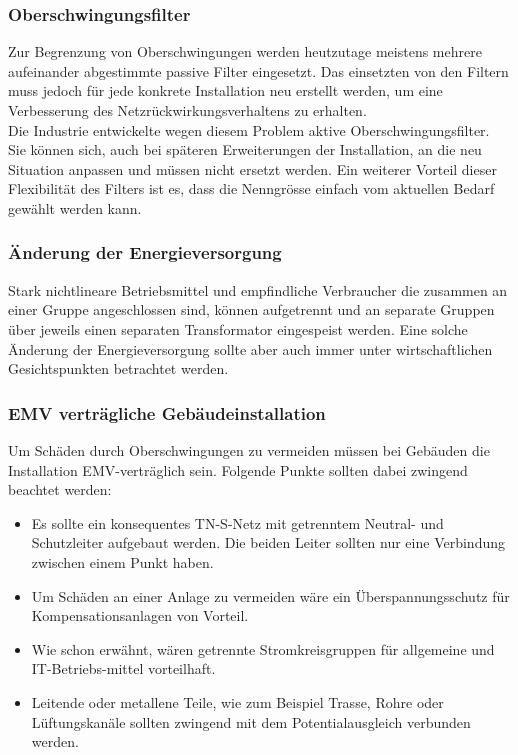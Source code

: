 \subsubsection{Oberschwingungsfilter}

Zur Begrenzung von Oberschwingungen werden heutzutage  meistens mehrere aufeinander abgestimmte passive Filter eingesetzt. Das einsetzten von den Filtern muss jedoch für jede konkrete Installation neu erstellt werden, um eine Verbesserung des Netzrückwirkungsverhaltens zu erhalten.\\
Die Industrie entwickelte wegen diesem Problem aktive Oberschwingungsfilter. Sie können sich, auch bei späteren Erweiterungen der Installation, an die neu Situation anpassen und müssen nicht ersetzt werden. Ein weiterer Vorteil dieser Flexibilität des Filters ist es, dass die Nenngrösse einfach vom aktuellen Bedarf gewählt werden kann.     

\subsubsection{Änderung der Energieversorgung}

Stark nichtlineare Betriebsmittel und empfindliche Verbraucher die zusammen an einer Gruppe angeschlossen sind, können aufgetrennt und an separate Gruppen über jeweils einen separaten Transformator eingespeist werden. Eine solche Änderung der Energieversorgung sollte aber auch immer unter wirtschaftlichen Gesichtspunkten betrachtet werden.

\subsubsection{EMV verträgliche Gebäudeinstallation}

Um Schäden durch Oberschwingungen zu vermeiden müssen bei Gebäuden die Installation EMV-verträglich sein.
Folgende Punkte sollten dabei zwingend beachtet werden:

\begin{itemize}
	\item Es sollte ein konsequentes TN-S-Netz mit getrenntem Neutral- und Schutzleiter aufgebaut werden. Die beiden Leiter sollten nur eine Verbindung zwischen einem Punkt haben.
	\item Um Schäden an einer Anlage zu vermeiden wäre ein Überspannungsschutz für Kompensationsanlagen von Vorteil.
	\item Wie schon erwähnt, wären getrennte Stromkreisgruppen für allgemeine und IT-Betriebs-mittel vorteilhaft.
	\item Leitende oder metallene Teile, wie zum Beispiel Trasse, Rohre oder Lüftungskanäle sollten zwingend mit dem Potentialausgleich verbunden werden.
	
\end{itemize}

